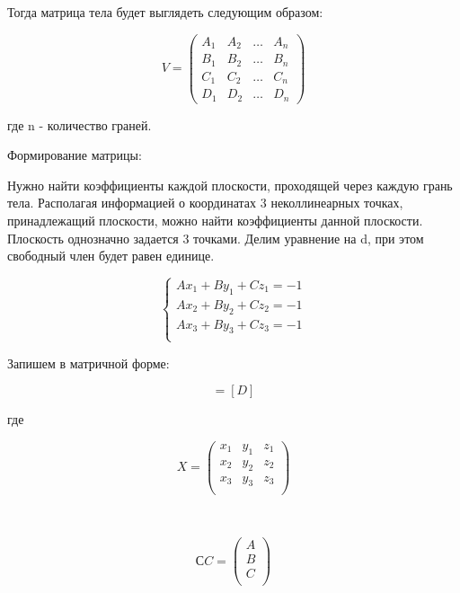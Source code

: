 Тогда матрица тела будет выглядеть следующим образом:

\begin{equation}
V = \left(
\begin{array}{cccc}
A_{1} & A_{2} & \ldots & A_{n}\\
B_{1} & B_{2} & \ldots & B_{n}\\
C_{1} & C_{2} & \ldots & C_{n}\\
D_{1} & D_{2} & \ldots & D_{n}
\end{array}
\right)
\end{equation}

где n - количество граней.

Формирование матрицы:

Нужно найти коэффициенты каждой плоскости, проходящей через каждую грань тела. Располагая информацией о координатах 3 неколлинеарных точках, принадлежащий плоскости, можно найти коэффициенты данной плоскости. Плоскость однозначно задается 3 точками. Делим уравнение на d, при этом свободный член будет равен единице.

\begin{equation}
{\begin{cases} 
	Ax_1 + By_1 + Cz_1 = -1 \\
	Ax_2 + By_2 + Cz_2 = -1 \\
	Ax_3 + By_3 + Cz_3 = -1 \\
	\end{cases}}
\end{equation}

Запишем в матричной форме:

\begin{equation}
	[X][C] = [D]
	\label{eq:ref1}	
\end{equation} 

где

\begin{equation}
X = \left(
\begin{array}{cccc}
x_{1} & y_{1} & z_{1}\\
x_{2} & y_{2} & z_{2}\\
x_{3} & y_{3} & z_{3}\\
\end{array}
\right)
\end{equation}

~

\begin{equation}
СC = \left(
\begin{array}{c}
A\\
B\\
C\\
\end{array}
\right)
\end{equation}

